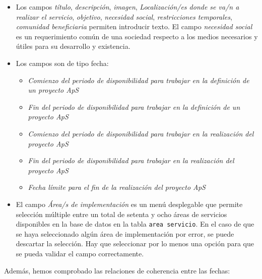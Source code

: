 \documentclass[11pt]{book}
\begin{document}
	\begin{itemize} 
		\item Los campos \emph{título}, \emph{descripción}, \emph{imagen}, \emph{Localización/es donde se va/n a realizar el servicio}, \emph{objetivo}, \emph{necesidad social}, \emph{restricciones temporales}, \emph{comunidad beneficiaria} permiten introducir texto. El campo \emph{necesidad social} es un requerimiento común de una sociedad respecto a los medios necesarios y útiles para su desarrollo y existencia.
		\item Los campos son de tipo fecha: 
		\begin{itemize} 
			\item  \emph{Comienzo del periodo de disponibilidad para trabajar en la definición
				de un proyecto ApS}
			\item  \emph{Fin del periodo de disponibilidad para trabajar en la definición de un
				proyecto ApS} 
			\item  \emph{Comienzo del periodo de disponibilidad para trabajar en la realización
				del proyecto ApS}
			\item  \emph{Fin del periodo de disponibilidad para trabajar en la realización del
				proyecto ApS} 
			\item  \emph{Fecha límite para el fin de la realización del proyecto ApS}
		\end{itemize}
		
		\item El campo \emph{Área/s de implementación} es un menú desplegable que permite selección múltiple entre un total de setenta y ocho áreas de servicios disponibles en la base de datos en la tabla  \texttt{area servicio}. En el caso de que se haya seleccionado algún área de implementación por error, se puede descartar la selección. Hay que seleccionar por lo menos una opción para que se pueda validar el campo correctamente.
	\end{itemize}
	Además, hemos comprobado las relaciones de coherencia entre las fechas:
\end{document}
